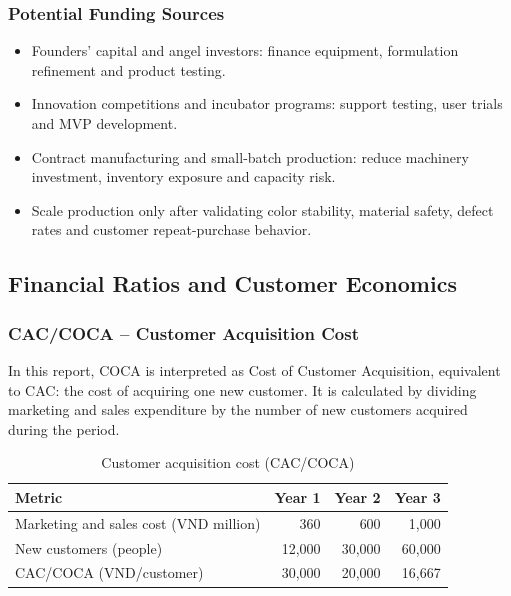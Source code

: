 \subsubsection{Potential Funding Sources}
\begin{itemize}[itemsep=0pt]
  \item Founders' capital and angel investors: finance equipment, formulation
    refinement and product testing.
  \item Innovation competitions and incubator programs: support testing, user
    trials and MVP development.
  \item Contract manufacturing and small-batch production: reduce machinery
    investment, inventory exposure and capacity risk.
  \item Scale production only after validating color stability, material safety,
    defect rates and customer repeat-purchase behavior.
\end{itemize}

\subsection{Financial Ratios and Customer Economics}

\subsubsection{CAC/COCA -- Customer Acquisition Cost}
In this report, COCA is interpreted as Cost of Customer Acquisition, equivalent to
CAC: the cost of acquiring one new customer. It is calculated by dividing
marketing and sales expenditure by the number of new customers acquired during
the period.

\begin{table}[ht]
\centering\small
\caption{Customer acquisition cost (CAC/COCA)}\label{tab:cac}
\begin{tabular}{@{}L{6.2cm}rrr@{}}
  \toprule
  \textbf{Metric} & \textbf{Year 1} & \textbf{Year 2} & \textbf{Year 3}\\
  \midrule
  Marketing and sales cost (VND million) & 360 & 600 & 1,000\\
  New customers (people) & 12,000 & 30,000 & 60,000\\
  CAC/COCA (VND/customer) & 30,000 & 20,000 & 16,667\\
  \bottomrule
\end{tabular}
\end{table}

